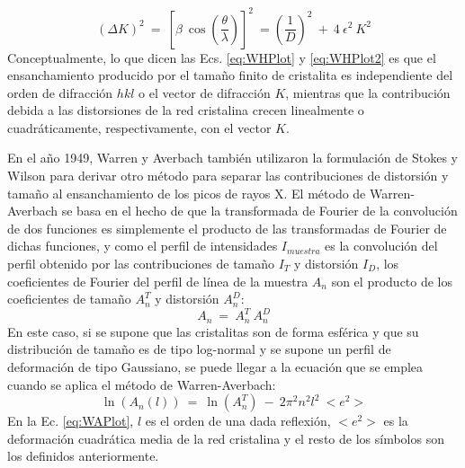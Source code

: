  \begin{equation}
  (\Delta K)^2 \ = \ \left[\beta \ \cos\left(\frac{\theta}{\lambda}\right)\right]^2 \ = \left(\frac{1}{D}\right)^2 \ + \ 4 \ \epsilon^2 \ K^2
  \label{eq:WHPlot2}
\end{equation}
\noindent
Conceptualmente, lo que dicen las Ecs. \ref{eq:WHPlot} y \ref{eq:WHPlot2} es que el ensanchamiento producido por el tamaño finito de cristalita es independiente del orden de difracción $hkl$ o el vector de difracción $K$, mientras que la contribución debida a las  distorsiones de la red cristalina crecen linealmente o cuadráticamente, respectivamente, con el vector $K$.

En el año 1949, Warren y Averbach\cite{WarrenAverbach1949} también utilizaron la formulación de Stokes y Wilson para derivar otro método para separar las contribuciones de distorsión y tamaño al ensanchamiento de los picos de rayos X. 
El método de Warren-Averbach se basa en el hecho de que la transformada de Fourier de la convolución de dos funciones es simplemente el producto de las transformadas de Fourier de dichas funciones, y como el perfil de intensidades $I_{muestra}$ es la convolución del perfil obtenido por las contribuciones de tamaño $I_{T}$ y distorsión $I_{D}$, los coeficientes de Fourier del perfil de línea de la muestra $A_n$ son el producto de los coeficientes de tamaño $A_n^T$ y distorsión $A_n^D$:
\begin{equation}
  A_n \ = \ A_n^T \ A_n^D
  \label{eq:FCoeff}
 \end{equation}
\noindent
En este caso, si se supone que las cristalitas son de forma esférica y que su distribución de tamaño es de tipo log-normal\cite{WikiLognormal} y se supone un perfil de deformación de tipo Gaussiano, se puede llegar a la ecuación que se emplea cuando se aplica el método de Warren-Averbach:
\begin{equation}
  \ln(A_n(l)) \ = \ \ln(A_n^T) \ - \ 2 \pi^2 n^2 l^2 \ <e^2>
  \label{eq:WAPlot}
 \end{equation}
\noindent
En la Ec. \ref{eq:WAPlot}, $l$ es el orden de una dada reflexión, $<e^2>$ es la deformación cuadrática media de la red cristalina y el resto de los símbolos son los definidos anteriormente.



